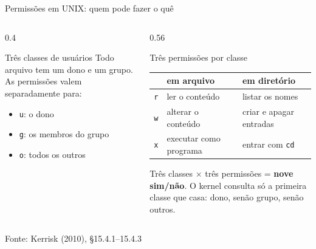 \documentclass[aspectratio=169]{beamer}
\newcommand{\fonte}[1]{\vfill\hfill{\scriptsize\textcolor{UFSGray}{Fonte: #1}}}
\begin{document}
\begin{frame}{Permissões em UNIX: quem pode fazer o quê}
  \begin{columns}[T]
    \begin{column}{0.4\textwidth}
      \begin{block}{Três classes de usuários}
        \small Todo arquivo tem um dono e um grupo.
        As permissões valem separadamente para:
        \begin{itemize}
          \item \texttt{u}: o dono
          \item \texttt{g}: os membros do grupo
          \item \texttt{o}: todos os outros
        \end{itemize}
      \end{block}
    \end{column}
    \begin{column}{0.56\textwidth}
      \begin{block}{Três permissões por classe}
        \scriptsize
        \begin{tabular}{@{}lll@{}}
          & em arquivo & em diretório\\
          \midrule
          \texttt{r} & ler o conteúdo         & listar os nomes\\
          \texttt{w} & alterar o conteúdo     & criar e apagar entradas\\
          \texttt{x} & executar como programa & entrar com \texttt{cd}\\
        \end{tabular}
      \end{block}
      \small Três classes $\times$ três permissões = \textbf{nove sim/não}.
      O kernel consulta só a primeira classe que casa: dono, senão grupo,
      senão outros.
    \end{column}
  \end{columns}
  \fonte{Kerrisk (2010), §15.4.1--15.4.3~\cite{kerrisk2010linux}}
\end{frame}
\end{document}

